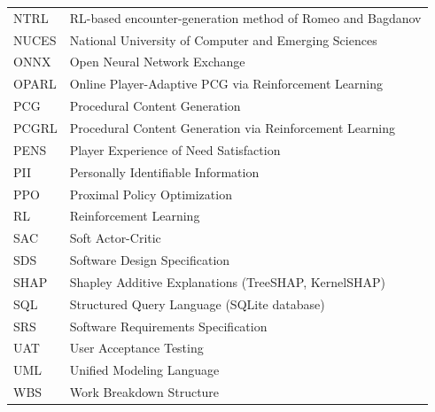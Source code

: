 \begin{longtable}{ll}
NTRL & RL-based encounter-generation method of Romeo and Bagdanov \\
NUCES & National University of Computer and Emerging Sciences \\
ONNX & Open Neural Network Exchange \\
OPARL & Online Player-Adaptive PCG via Reinforcement Learning \\
PCG & Procedural Content Generation \\
PCGRL & Procedural Content Generation via Reinforcement Learning \\
PENS & Player Experience of Need Satisfaction \\
PII & Personally Identifiable Information \\
PPO & Proximal Policy Optimization \\
RL & Reinforcement Learning \\
SAC & Soft Actor-Critic \\
SDS & Software Design Specification \\
SHAP & Shapley Additive Explanations (TreeSHAP, KernelSHAP) \\
SQL & Structured Query Language (SQLite database) \\
SRS & Software Requirements Specification \\
UAT & User Acceptance Testing \\
UML & Unified Modeling Language \\
WBS & Work Breakdown Structure \\
\bottomrule
\end{longtable}
